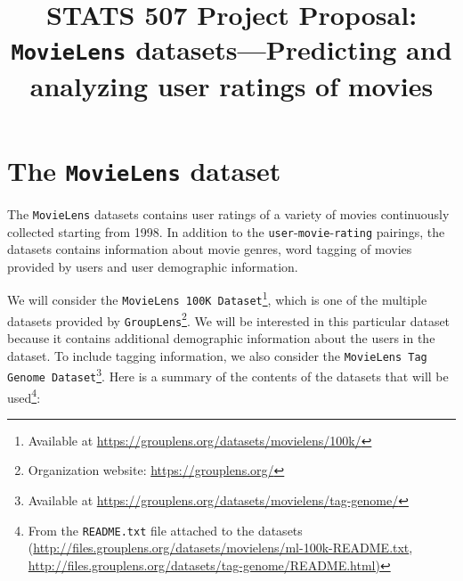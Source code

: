 \documentclass[bj, preprint]{imsart}
\begin{document}
\begin{frontmatter}

\title{{\Large STATS 507 Project Proposal:} \\ 
\bf \texttt{MovieLens} datasets---Predicting and analyzing user ratings of movies}






\tableofcontents
\listoftodos
\end{frontmatter}



\section{The \texttt{MovieLens} dataset}\label{sec:setting}

The \texttt{MovieLens} datasets \citep{harper2015MovieLensDatasetsHistory} contains user ratings of a variety of movies continuously collected starting from 1998. 
In addition to the \texttt{user}-\texttt{movie}-\texttt{rating} pairings, the datasets contains information about movie genres, word tagging of movies provided by users and user demographic information. 

We will consider the \texttt{MovieLens 100K Dataset}\footnote{Available at \url{https://grouplens.org/datasets/movielens/100k/}}, which is one of the multiple datasets provided by \texttt{GroupLens}\footnote{Organization website: \url{https://grouplens.org/}}. 
We will be interested in this particular dataset because it contains additional demographic information about the users in the dataset. 
To include tagging information, we also consider the \texttt{MovieLens Tag Genome Dataset}\footnote{Available at \url{https://grouplens.org/datasets/movielens/tag-genome/}}. 
Here is a summary of the contents of the datasets that will be used\footnote{From the \texttt{README.txt} file attached to the datasets (\url{http://files.grouplens.org/datasets/movielens/ml-100k-README.txt}, \url{http://files.grouplens.org/datasets/tag-genome/README.html)}}:
\end{document}
